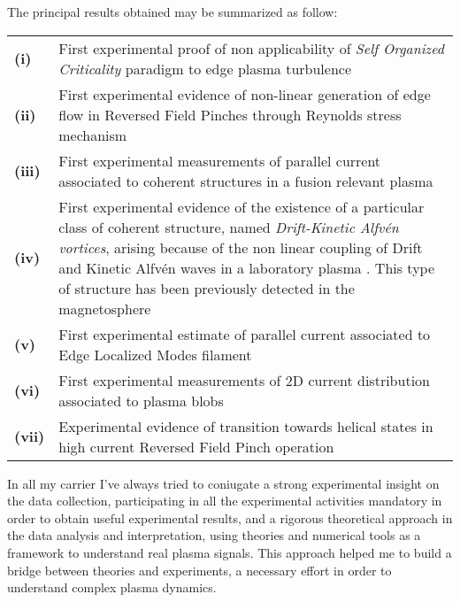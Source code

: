 The principal results obtained may be summarized as
follow:
\begin{longtable}{>{\bfseries}l p{17cm}}
(i) &  First experimental proof of non applicability of \emph{Self
    Organized Criticality} paradigm to edge plasma
  turbulence \parencite{Spada:2001p3574,Antoni:2001p3221} \\
(ii) &  First experimental evidence of non-linear generation of edge
  flow in Reversed Field Pinches through Reynolds stress
  mechanism \parencite{Vianello:2005p1976,Vianello:2005p2671} \\
(iii) & First experimental measurements of parallel current associated
  to coherent structures in a fusion relevant plasma \parencite{Spolaore:2009p4115} \\
(iv) & First experimental evidence of the existence of a particular 
  class of coherent structure, named \emph{Drift-Kinetic Alfv\'en
    vortices}, arising because of the non linear coupling of Drift and
  Kinetic Alfv\'en waves in a laboratory plasma \parencite{Vianello:2010p4670}. This type of structure has been
  previously detected in the magnetosphere \\
(v) &  First experimental estimate of parallel current associated to
  Edge Localized Modes filament \parencite{PhysRevLett.106.125002} \\
(vi) & First experimental measurements of 2D current distribution
associated to plasma blobs \parencite{Furno:2011cs} \\
(vii) & Experimental evidence of transition towards helical states in
high current Reversed Field Pinch
operation \parencite{Lorenzini:2009p4248} \\
\end{longtable}

In all my carrier I've always tried to coniugate a strong experimental
insight on the data collection, participating in all the experimental
activities mandatory in order to obtain useful experimental results, and a rigorous theoretical approach in
the data analysis and interpretation, using theories and numerical
tools as a framework to understand real plasma signals. This
approach helped me to build a bridge between theories and experiments,
a necessary effort in order to understand complex plasma dynamics.
